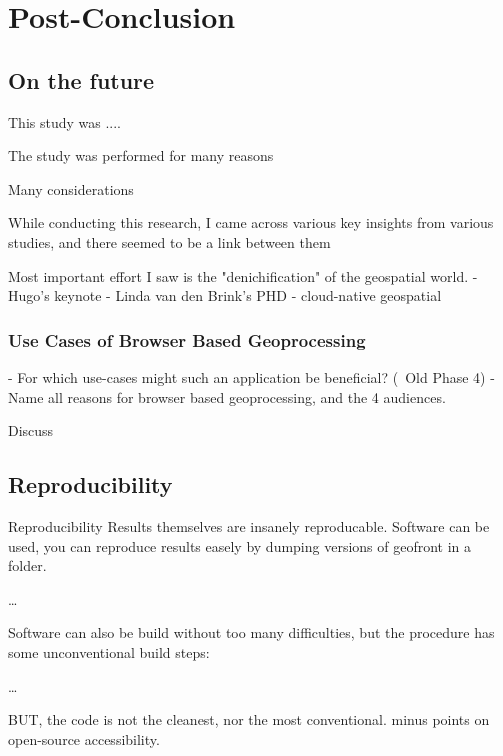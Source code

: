 \chapter{Post-Conclusion}%

\section{On the future}

This study was ....

The study was performed for many reasons

Many considerations


While conducting this research, I came across various key insights from various studies, and there seemed to be a link between them 

Most important effort I saw is the "denichification" of the geospatial world.
- Hugo's keynote
- Linda van den Brink's PHD
- cloud-native geospatial 


\subsection{Use Cases of Browser Based Geoprocessing}



- For which use-cases might such an application be beneficial? (~Old Phase 4)
- Name all reasons for browser based geoprocessing, and the 4 audiences.

Discuss 

\section{Reproducibility}

Reproducibility
Results themselves are insanely reproducable.
Software can be used, you can reproduce results easely by dumping versions of geofront in 
a folder.

\dots

Software can also be build without too many difficulties, but the procedure has some unconventional build steps: 

\dots

BUT, the code is not the cleanest, nor the most conventional. minus points on open-source accessibility.




